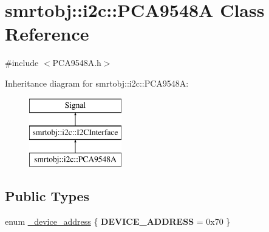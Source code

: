 \hypertarget{classsmrtobj_1_1i2c_1_1_p_c_a9548_a}{}\section{smrtobj\+:\+:i2c\+:\+:P\+C\+A9548\+A Class Reference}
\label{classsmrtobj_1_1i2c_1_1_p_c_a9548_a}


{\ttfamily \#include $<$P\+C\+A9548\+A.\+h$>$}

Inheritance diagram for smrtobj\+:\+:i2c\+:\+:P\+C\+A9548\+A\+:\begin{figure}[H]
\begin{center}
\leavevmode
\includegraphics[height=3.000000cm]{classsmrtobj_1_1i2c_1_1_p_c_a9548_a}
\end{center}
\end{figure}
\subsection*{Public Types}
\begin{DoxyCompactItemize}
\item 
enum \hyperlink{classsmrtobj_1_1i2c_1_1_p_c_a9548_a_af9c75361cf8673778debf8a0822e1637}{\+\_\+device\+\_\+address} \{ {\bfseries D\+E\+V\+I\+C\+E\+\_\+\+A\+D\+D\+R\+E\+S\+S} = 0x70
 \}
\end{DoxyCompactItemize}
